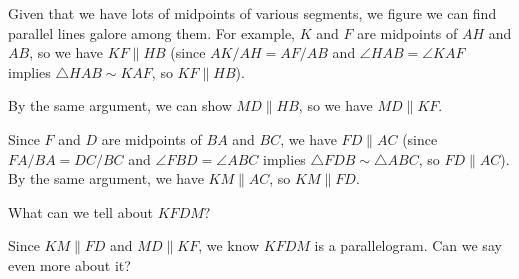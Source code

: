 





Given that we have lots of midpoints of various segments, we figure we can find parallel lines galore among them. For example, $K$ and $F$ are midpoints of $AH$ and $AB$, so we have $KF \parallel HB$ (since $AK/AH = AF/AB$ and $\angle HAB = \angle KAF$ implies $\triangle HAB \sim KAF$, so $KF \parallel HB$).

By the same argument, we can show $MD \parallel HB$, so we have $MD \parallel KF$.

Since $F$ and $D$ are midpoints of $BA$ and $BC$, we have $FD \parallel AC$ (since $FA/BA = DC/BC$ and $\angle FBD = \angle ABC$ implies $\triangle FDB \sim  \triangle ABC$, so $FD \parallel AC$). By the same argument, we have $KM \parallel AC$, so $KM \parallel FD$.

What can we tell about $KFDM?$





Since $KM \parallel FD$ and $MD \parallel KF$, we know $KFDM$ is a parallelogram. Can we say even more about it?


